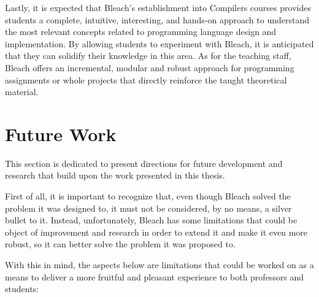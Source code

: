 Lastly, it is expected that Bleach's establishment into Compilers courses provides students a complete, intuitive, interesting, and hands-on approach to understand the most relevant concepts related to programming language design and implementation. By allowing students to experiment with Bleach, it is anticipated that they can solidify their knowledge in this area. As for the teaching staff, Bleach offers an incremental, modular and robust approach for programming assignments or whole projects that directly reinforce the taught theoretical material.

\section{Future Work}
This section is dedicated to present directions for future development and research that build upon the work presented in this thesis.

First of all, it is important to recognize that, even though Bleach solved the problem it was designed to, it must not be considered, by no means, a silver bullet to it. Instead, unfortunately, Bleach has some limitations that could be object of improvement and research in order to extend it and make it even more robust, so it can better solve the problem it was proposed to.

With this in mind, the aspects below are limitations that could be worked on as a means to deliver a more fruitful and pleasant experience to both professors and students:

